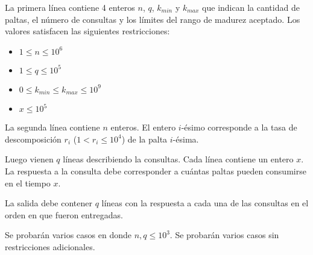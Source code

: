 \documentclass{oci}
\begin{document}
\begin{inputDescription}

La primera línea contiene 4 enteros
$n$, $q$, $k_{min}$ y $k_{max}$
que indican la cantidad de paltas, el número de consultas y los límites del rango de madurez aceptado.
Los valores satisfacen las siguientes restricciones:

\begin{itemize}
  \item $1 \leq n \leq 10^6$
  \item $1 \leq q \leq 10^5$
  \item $0 \leq k_{min} \leq k_{max} \leq 10^9$
  \item $x \leq 10^5$
\end{itemize}

La segunda línea contiene $n$ enteros.
El entero $i$-ésimo corresponde a la tasa de descomposición $r_i$ ($1 < r_i \leq 10^4$)
de la palta $i$-ésima.

Luego vienen $q$ líneas describiendo la consultas.
Cada línea contiene un entero $x$.
La respuesta a la consulta debe corresponder a cuántas paltas pueden consumirse
en el tiempo $x$.

\end{inputDescription}

\begin{outputDescription}
La salida debe contener $q$ líneas con la respuesta a cada una de las consultas en el orden en que
fueron entregadas.
\end{outputDescription}

\begin{scoreDescription}
  Se probarán varios casos en donde $n, q \leq 10^3$.
  Se probarán varios casos sin restricciones adicionales.
\end{scoreDescription}
\end{document}
